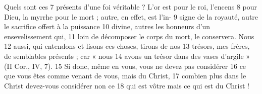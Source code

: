Quels sont ces	 
7	 	présents d'une foi véritable ? L'or est pour le roi, l'encens	 
8	 	pour Dieu, la myrrhe pour le mort ; autre, en effet, est l'in-	 
9	 	signe de la royauté, autre le sacrifice offert à la puissance	 
10	 	divine, autres les honneurs d'un ensevelissement qui,	 
11	 	loin de décomposer le corps du mort, le conservera. Nous	 
12	 	aussi, qui entendons et lisons ces choses, tirons de nos	 
13	 	trésors, mes frères, de semblables présents ; car « nous	 
14	 	avons un trésor dans des vases d'argile » (II Cor., IV, 7).	 
15	 	Si donc, même en vous, vous ne devez pas considérer	 
16	 	ce que vous êtes comme venant de vous, mais du Christ,	 
17	 	combien plus dans le Christ devez-vous considérer non ce	 
18	 	qui est vôtre mais ce qui est du Christ !